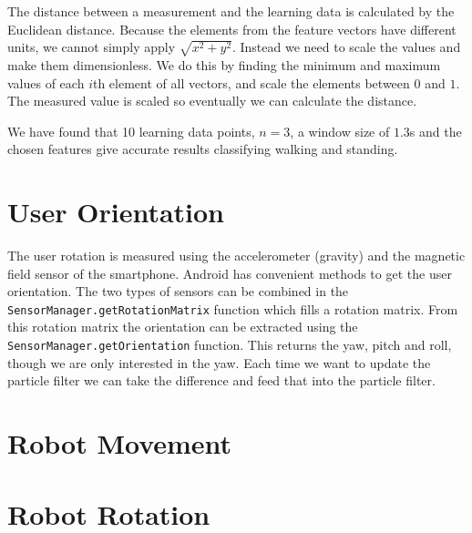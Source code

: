 \documentclass[journal]{IEEEtran}
\begin{document}
The distance between a measurement and the learning data is calculated by the
Euclidean distance. Because the elements from the feature vectors have
different units, we cannot simply apply $\sqrt{ x^2+y^2 }$. Instead we need to
scale the values and make them dimensionless. We do this by finding the minimum
and maximum values of each $i$th element of all vectors, and scale the elements
between $0$ and $1$. The measured value is scaled so eventually we can
calculate the distance.

We have found that 10 learning data points, $n=3$, a window size of $1.3$s
and the chosen features give accurate results classifying walking and standing.

\section{User Orientation}

The user rotation is measured using the accelerometer (gravity) and the
magnetic field sensor of the smartphone. Android has convenient methods to get
the user orientation. The two types of sensors can be combined in the
\texttt{SensorManager.getRotationMatrix} function which fills a rotation
matrix. From this rotation matrix the orientation can be extracted using the
\texttt{SensorManager.getOrientation} function. This returns the yaw, pitch
and roll, though we are only interested in the yaw. Each time we want to update
the particle filter we can take the difference and feed that into the particle
filter.

\section{Robot Movement}

\section{Robot Rotation}
\end{document}
